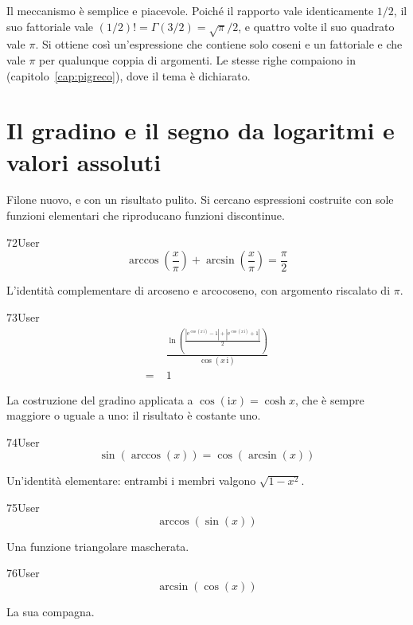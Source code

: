 Il meccanismo è semplice e piacevole. Poiché il rapporto vale identicamente $1/2$, il suo fattoriale vale $(1/2)!=\Gamma(3/2)=\sqrt\pi/2$, e quattro volte il suo quadrato vale $\pi$. Si ottiene così un'espressione che contiene solo coseni e un fattoriale e che vale $\pi$ per qualunque coppia di argomenti. Le stesse righe compaiono in  (capitolo~\ref{cap:pigreco}), dove il tema è dichiarato.

\section{Il gradino e il segno da logaritmi e valori assoluti}

Filone nuovo, e con un risultato pulito. Si cercano espressioni costruite con sole funzioni elementari che riproducano funzioni discontinue.

\begin{espr}{72}{User}{\verificata}
\[
\arccos\!\left(\frac{x}{\pi}\right) + \arcsin\!\left(\frac{x}{\pi}\right) = \frac{\pi}{2}
\]
\end{espr}
L'identità complementare di arcoseno e arcocoseno, con argomento riscalato di $\pi$.

\begin{espr}{73}{User}{}
\begin{align*}
& \frac{\ln\!\left(\frac{\left|\mathrm{e}^{\cos\!\left(x\, \mathrm{i}\right)} - 1\right| + \left|\mathrm{e}^{\cos\!\left(x\, \mathrm{i}\right)} + 1\right|}{2}\right)}{\cos\!\left(x\, \mathrm{i}\right)} \\
=\;& 1
\end{align*}
\end{espr}
La costruzione del gradino applicata a $\cos(\mathrm{i}x)=\cosh x$, che è sempre maggiore o uguale a uno: il risultato è costante uno.

\begin{espr}{74}{User}{\verificata}
\[
\sin\!\left(\arccos\!\left(x\right)\right) = \cos\!\left(\arcsin\!\left(x\right)\right)
\]
\end{espr}
Un'identità elementare: entrambi i membri valgono $\sqrt{1-x^2}$.

\begin{espr}{75}{User}{}
\[
\arccos\!\left(\sin\!\left(x\right)\right)
\]
\end{espr}
Una funzione triangolare mascherata.

\begin{espr}{76}{User}{}
\[
\arcsin\!\left(\cos\!\left(x\right)\right)
\]
\end{espr}
La sua compagna.

